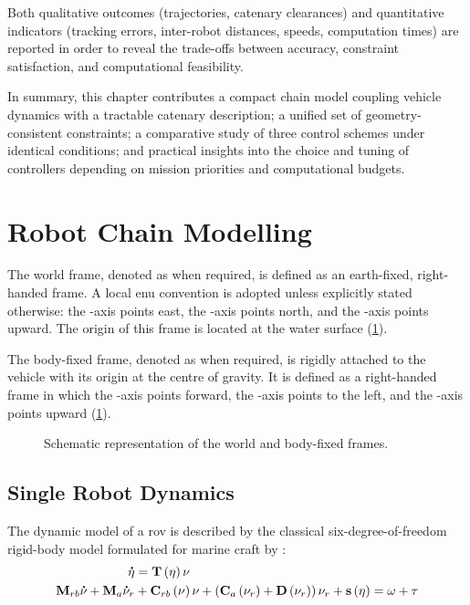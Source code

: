 Both qualitative outcomes (trajectories, catenary clearances) and quantitative indicators (tracking
errors, inter-robot distances, speeds, computation times) are reported in order to reveal the
trade-offs between accuracy, constraint satisfaction, and computational feasibility.

In summary, this chapter contributes a compact chain model coupling vehicle dynamics with a
tractable catenary description; a unified set of geometry-consistent constraints; a comparative
study of three control schemes under identical conditions; and practical insights into the choice
and tuning of controllers depending on mission priorities and computational budgets.

\section{Robot Chain Modelling}
\label{rcc_robot_chain_modelling}

The world frame, denoted as  when required, is defined as an earth-fixed, right-handed
frame. A local \ac{enu} convention is adopted unless explicitly stated otherwise: the -axis
points east, the -axis points north, and the -axis points upward. The origin of
this frame is located at the water surface (\cref{rcc_rcm_frames}).

The body-fixed frame, denoted as  when required, is rigidly attached to the vehicle with
its origin at the centre of gravity. It is defined as a right-handed frame in which the
-axis points forward, the -axis points to the left, and the -axis points
upward (\cref{rcc_rcm_frames}).

\begin{figure}
	\centering
	\caption{Schematic representation of the world and body-fixed frames.}
	\label{rcc_rcm_frames}
\end{figure}

\subsection{Single Robot Dynamics}
\label{rcc_rcm_single_robot_dynamics}

The dynamic model of a \ac{rov} is described by the classical six-degree-of-freedom rigid-body
model formulated for marine craft by \cite{fossenHandbookMarineCraft2011}:
\begin{align}
	\vect{\dot{\eta}} & = \matr{T}\left(\vect{\eta}\right) \vect{\nu} \label{rcc_rcm_srd_kinematics} \\
	\lrdmatr{M}{rb} \vect{\dot{\nu}} + \lrdmatr{M}{a} \ldvect{\dot{\nu}}{r}
	                  & + \lrdmatr{C}{rb}\left(\vect{\nu}\right) \vect{\nu}
	+ \left(\lrdmatr{C}{a}\left(\ldvect{\nu}{r}\right) + \matr{D}\left(\ldvect{\nu}{r}\right)\right) \ldvect{\nu}{r}
	+ \vect{s}\left(\vect{\eta}\right) = \vect{\omega} + \vect{\tau}
	\label{rcc_rcm_srd_dynamics}
\end{align}

